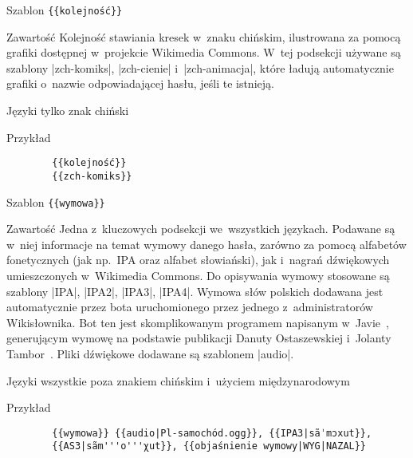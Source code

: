 \spacer
\begin{opis}
	\item[Szablon] \verb|{{kolejność}}|
	\item[Zawartość] Kolejność stawiania kresek w~znaku chińskim, ilustrowana za pomocą grafiki dostępnej w~projekcie Wikimedia Commons. W~tej podsekcji używane są szablony \kod|{{zch-komiks}}|, \kod|{{zch-cienie}}| i~\kod|{{zch-animacja}}|, które ładują automatycznie grafiki o~nazwie odpowiadającej hasłu, jeśli te istnieją.
	\item[Języki] tylko znak chiński
	\item[Przykład]
		\begin{verbatim}
		{{kolejność}}
		{{zch-komiks}}
		\end{verbatim}
\end{opis}
\spacer
\begin{opis}
	\item[Szablon] \verb|{{wymowa}}|
	\item[Zawartość] Jedna z~kluczowych podsekcji we~wszystkich językach. Podawane są w~niej informacje na temat wymowy danego hasła, zarówno za pomocą alfabetów fonetycznych (jak np.\ IPA oraz alfabet słowiański), jak i~nagrań dźwiękowych umieszczonych w~Wikimedia Commons. Do opisywania wymowy stosowane są szablony \kod|{{IPA}}|, \kod|{{IPA2}}|, \kod|{{IPA3}}|, \kod|{{IPA4}}|. Wymowa słów polskich dodawana jest automatycznie przez bota uruchomionego przez jednego z~administratorów Wikisłownika. Bot ten jest skomplikowanym programem napisanym w~Javie~\cite{wikt:olafbot}, generującym wymowę na podstawie publikacji Danuty Ostaszewskiej i~Jolanty Tambor~\cite{fonetyka}.
	Pliki dźwiękowe dodawane są szablonem \kod|{{audio}}|.
	\item[Języki] wszystkie poza znakiem chińskim i~użyciem międzynarodowym
	\item[Przykład]
		\begin{verbatim}
		{{wymowa}} {{audio|Pl-samochód.ogg}}, {{IPA3|sãˈmɔxut}},
		{{AS3|sãm'''o'''χut}}, {{objaśnienie wymowy|WYG|NAZAL}}
		\end{verbatim}
\end{opis}
\spacer
